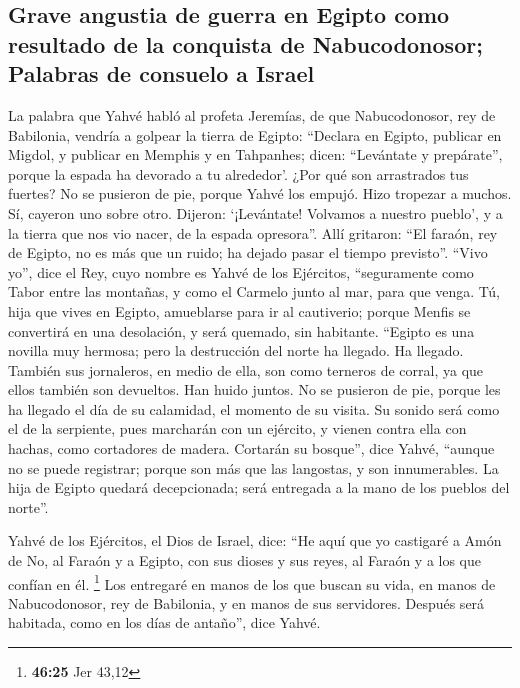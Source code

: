 \hypertarget{grave-angustia-de-guerra-en-egipto-como-resultado-de-la-conquista-de-nabucodonosor-palabras-de-consuelo-a-israel}{%
\subsection{Grave angustia de guerra en Egipto como resultado de la
conquista de Nabucodonosor; Palabras de consuelo a
Israel}\label{grave-angustia-de-guerra-en-egipto-como-resultado-de-la-conquista-de-nabucodonosor-palabras-de-consuelo-a-israel}}

 La palabra que Yahvé habló al profeta Jeremías, de que
Nabucodonosor, rey de Babilonia, vendría a golpear la tierra de Egipto:
 ``Declara en Egipto, publicar en Migdol, y publicar en
Memphis y en Tahpanhes; dicen: ``Levántate y prepárate'', porque la
espada ha devorado a tu alrededor'.  ¿Por qué son
arrastrados tus fuertes? No se pusieron de pie, porque Yahvé los empujó.
 Hizo tropezar a muchos. Sí, cayeron uno sobre otro.
Dijeron: `¡Levántate! Volvamos a nuestro pueblo', y a la tierra que nos
vio nacer, de la espada opresora''.  Allí gritaron: ``El
faraón, rey de Egipto, no es más que un ruido; ha dejado pasar el tiempo
previsto''.  ``Vivo yo'', dice el Rey, cuyo nombre es
Yahvé de los Ejércitos, ``seguramente como Tabor entre las montañas, y
como el Carmelo junto al mar, para que venga.  Tú, hija
que vives en Egipto, amueblarse para ir al cautiverio; porque Menfis se
convertirá en una desolación, y será quemado, sin habitante.
 ``Egipto es una novilla muy hermosa; pero la destrucción
del norte ha llegado. Ha llegado.  También sus
jornaleros, en medio de ella, son como terneros de corral, ya que ellos
también son devueltos. Han huido juntos. No se pusieron de pie, porque
les ha llegado el día de su calamidad, el momento de su visita.
 Su sonido será como el de la serpiente, pues marcharán
con un ejército, y vienen contra ella con hachas, como cortadores de
madera.  Cortarán su bosque'', dice Yahvé, ``aunque no se
puede registrar; porque son más que las langostas, y son innumerables.
 La hija de Egipto quedará decepcionada; será entregada a
la mano de los pueblos del norte''.

 Yahvé de los Ejércitos, el Dios de Israel, dice: ``He
aquí que yo castigaré a Amón de No, al Faraón y a Egipto, con sus dioses
y sus reyes, al Faraón y a los que confían en él. \footnote{\textbf{46:25}
  Jer 43,12}  Los entregaré en manos de los que buscan su
vida, en manos de Nabucodonosor, rey de Babilonia, y en manos de sus
servidores. Después será habitada, como en los días de antaño'', dice
Yahvé.

